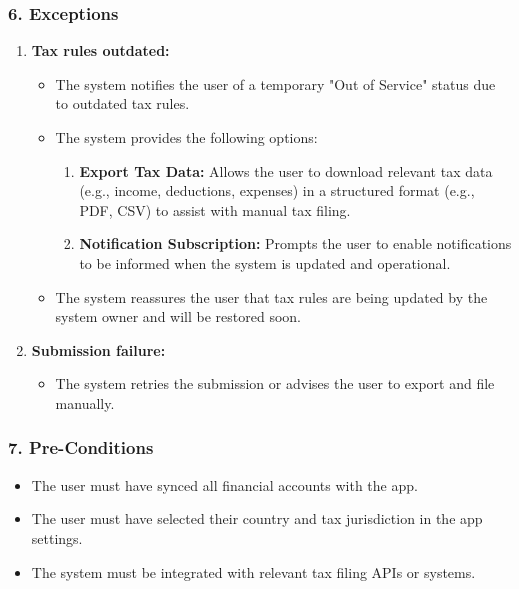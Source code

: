 \subsubsection*{6. Exceptions}
\begin{enumerate}[label=6.\arabic*]
    \item \textbf{Tax rules outdated:}
    \begin{itemize}
        \item The system notifies the user of a temporary "Out of Service" status due to outdated tax rules.
        \item The system provides the following options:
        \begin{enumerate}[label=\alph*.]
            \item \textbf{Export Tax Data:} Allows the user to download relevant tax data (e.g., income, deductions, expenses) in a structured format (e.g., PDF, CSV) to assist with manual tax filing.
            \item \textbf{Notification Subscription:} Prompts the user to enable notifications to be informed when the system is updated and operational.
        \end{enumerate}
        \item The system reassures the user that tax rules are being updated by the system owner and will be restored soon.
    \end{itemize}
    \item \textbf{Submission failure:}
    \begin{itemize}
        \item The system retries the submission or advises the user to export and file manually.
    \end{itemize}
\end{enumerate}

\subsubsection*{7. Pre-Conditions}
\begin{itemize}
    \item The user must have synced all financial accounts with the app.
    \item The user must have selected their country and tax jurisdiction in the app settings.
    \item The system must be integrated with relevant tax filing APIs or systems.
\end{itemize}

